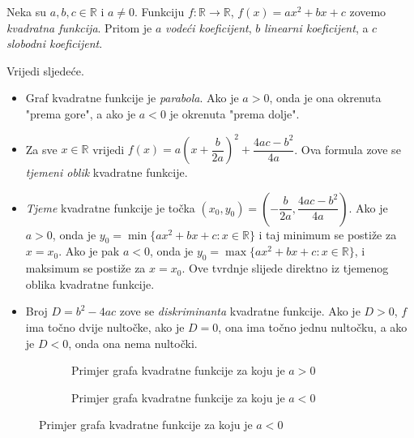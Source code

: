 \begin{definition}
Neka su $a, b, c\in \mathbb{R}$ i $a\neq 0$. Funkciju $f : \mathbb{R}\to \mathbb{R}$, $f(x)=ax^2+bx+c$ zovemo \textit{kvadratna funkcija}. Pritom je $a$ \textit{vodeći koeficijent}, $b$ \textit{linearni koeficijent}, a $c$ \textit{slobodni koeficijent}.
\end{definition}
Vrijedi sljedeće.
\begin{itemize}
\item Graf kvadratne funkcije je \textit{parabola}. Ako je $a>0$, onda je ona okrenuta "prema gore", a ako je $a<0$ je okrenuta "prema dolje".
\item Za sve $x\in \mathbb{R}$ vrijedi $f(x)=a\left(x+\dfrac{b}{2a}\right)^2+\dfrac{4ac-b^2}{4a}$. Ova formula zove se \textit{tjemeni oblik} kvadratne funkcije.
\item \textit{Tjeme} kvadratne funkcije je točka $(x_0, y_0)=\left(-\dfrac{b}{2a}, \dfrac{4ac-b^2}{4a}\right)$. Ako je $a>0$, onda je $y_0=\min\{ax^2+bx+c : x\in \mathbb{R}\}$ i taj minimum se postiže za $x=x_0$. Ako je pak $a<0$, onda je $y_0=\max\{ax^2+bx+c : x\in \mathbb{R}\}$, i maksimum se postiže za $x=x_0$. Ove tvrdnje slijede direktno iz tjemenog oblika kvadratne funkcije.
\item Broj $D=b^2-4ac$ zove se \textit{diskriminanta} kvadratne funkcije. Ako je $D>0$, $f$ ima točno dvije nultočke, ako je $D=0$, ona ima točno jednu nultočku, a ako je $D<0$, onda ona nema nultočki.
\end{itemize}
\begin{figure}[ht]
\begin{subfigure}[t]{.5\textwidth}
\centering
{}
\caption*{Primjer grafa kvadratne funkcije za koju je $a>0$}
\end{subfigure}%
\begin{subfigure}[t]{.5\textwidth}
\centering
{}
\caption*{Primjer grafa kvadratne funkcije za koju je $a<0$}
\end{subfigure}
\end{figure}
